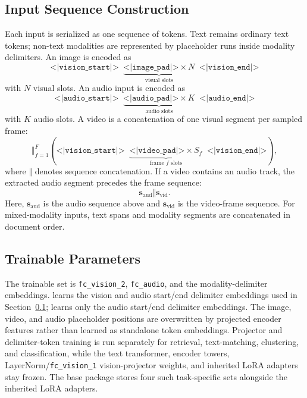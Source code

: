 \subsection{Input Sequence Construction}
\label{sec:method:input-sequence}

Each input is serialized as one sequence of tokens.
Text remains ordinary text tokens; non-text modalities are represented by placeholder runs inside modality delimiters.
An image is encoded as
\begin{equation*}
\texttt{<|vision\_start|>} \;\; \underbrace{\texttt{<|image\_pad|>} \times N}_{\text{visual slots}} \;\; \texttt{<|vision\_end|>}
\label{eq:img_seq}
\end{equation*}
with $N$ visual slots.
An audio input is encoded as
\begin{equation*}
\texttt{<|audio\_start|>} \;\; \underbrace{\texttt{<|audio\_pad|>} \times K}_{\text{audio slots}} \;\; \texttt{<|audio\_end|>}
\label{eq:aud_seq}
\end{equation*}
with $K$ audio slots.
A video is a concatenation of one visual segment per sampled frame:
\begin{equation*}
\big\Vert_{f=1}^{F}
\left(
\texttt{<|vision\_start|>} \;\; \underbrace{\texttt{<|video\_pad|>} \times S_f}_{\text{frame } f \text{ slots}} \;\; \texttt{<|vision\_end|>}
\right),
\label{eq:video_seq}
\end{equation*}
where $\Vert$ denotes sequence concatenation.
If a video contains an audio track, the extracted audio segment precedes the frame sequence:
\begin{equation*}
\mathbf{s}_{\text{aud}} \Vert \mathbf{s}_{\text{vid}}.
\label{eq:video_audio_seq}
\end{equation*}
Here, $\mathbf{s}_{\text{aud}}$ is the audio sequence above and $\mathbf{s}_{\text{vid}}$ is the video-frame sequence.
For mixed-modality inputs, text spans and modality segments are concatenated in document order.

\subsection{Trainable Parameters}
\label{sec:method:trainable-parameters}

The trainable set is \texttt{fc\_vision\_2}, \texttt{fc\_audio}, and the modality-delimiter embeddings.
\omniSmall{} learns the vision and audio start/end delimiter embeddings used in Section~\ref{sec:method:input-sequence}; \omniNano{} learns only the audio start/end delimiter embeddings.
The image, video, and audio placeholder positions are overwritten by projected encoder features rather than learned as standalone token embeddings.
Projector and delimiter-token training is run separately for retrieval, text-matching, clustering, and classification, while the text transformer, encoder towers, LayerNorm/\texttt{fc\_vision\_1} vision-projector weights, and inherited LoRA adapters stay frozen.
The base package stores four such task-specific sets alongside the inherited LoRA adapters.

